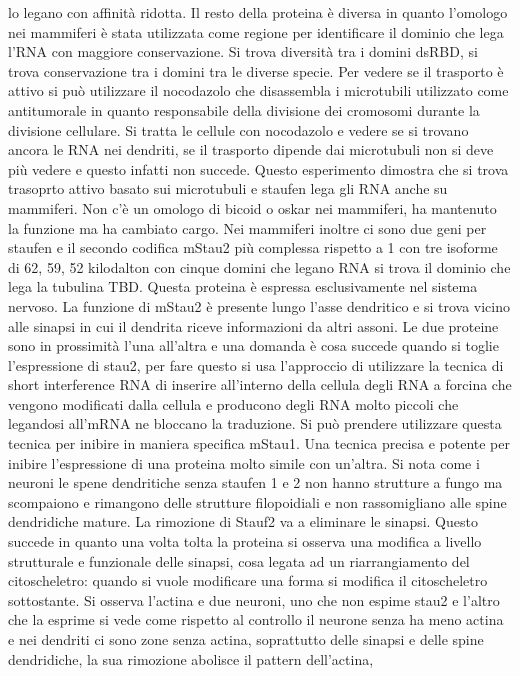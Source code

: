 lo legano con affinit\`a ridotta. Il resto della proteina \`e diversa in quanto l'omologo nei mammiferi \`e stata utilizzata come regione per identificare il dominio che lega l'RNA con
maggiore conservazione. Si trova diversit\`a tra i domini dsRBD, si trova conservazione tra i domini tra le diverse specie. Per vedere se il trasporto \`e attivo si pu\`o utilizzare il
nocodazolo che disassembla i microtubili utilizzato come antitumorale in quanto responsabile della divisione dei cromosomi durante la divisione cellulare. Si tratta le cellule con 
nocodazolo e vedere se si trovano ancora le RNA nei dendriti, se il trasporto dipende dai microtubuli non si deve pi\`u vedere e questo infatti non succede. Questo esperimento dimostra
che si trova trasoprto attivo basato sui microtubuli e staufen lega gli RNA anche su mammiferi. Non c'\`e un omologo di bicoid o oskar nei mammiferi, ha mantenuto la funzione ma ha
cambiato cargo. Nei mammiferi inoltre ci sono due geni per staufen e il secondo codifica mStau2 pi\`u complessa rispetto a 1 con tre isoforme di 62, 59, 52 kilodalton con cinque 
domini che legano RNA si trova il dominio che lega la tubulina TBD. Questa proteina \`e espressa esclusivamente nel sistema nervoso. La funzione di mStau2 \`e presente lungo l'asse 
dendritico e si trova vicino alle sinapsi in cui il dendrita riceve informazioni da altri assoni. Le due proteine sono in prossimit\`a l'una all'altra e una domanda \`e cosa succede
quando si toglie l'espressione di stau2, per fare questo si usa l'approccio di utilizzare la tecnica di short interference RNA di inserire all'interno della cellula degli RNA a forcina
che vengono modificati dalla cellula e producono degli RNA molto piccoli che legandosi all'mRNA ne bloccano la traduzione. Si pu\`o prendere utilizzare questa tecnica per inibire in 
maniera specifica mStau1. Una tecnica precisa e potente per inibire l'espressione di una proteina molto simile con un'altra. Si nota come i neuroni le spene dendritiche senza staufen 1 e 
2 non hanno strutture a fungo ma scompaiono e rimangono delle strutture filopoidiali e non rassomigliano alle spine dendridiche mature. La rimozione di Stauf2 va a eliminare le sinapsi. 
Questo succede in quanto una volta tolta la proteina si osserva una modifica a livello strutturale e funzionale delle sinapsi, cosa legata ad un riarrangiamento del citoscheletro: quando
si vuole modificare una forma si modifica il citoscheletro sottostante. Si osserva l'actina e due neuroni, uno che non espime stau2 e l'altro che la esprime si vede come rispetto al
controllo il neurone senza ha meno actina e nei dendriti ci sono zone senza actina, soprattutto delle sinapsi e delle spine dendridiche, la sua rimozione abolisce il pattern dell'actina,
